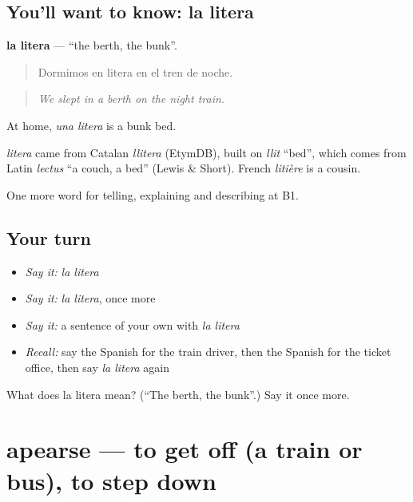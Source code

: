 \subsection*{You'll want to know: la litera}
\textbf{la litera} — \textquotedblleft{}the berth, the bunk\textquotedblright{}.

\begin{quote}
Dormimos en litera en el tren de noche.
\end{quote}

\begin{quote}
\emph{We slept in a berth on the night train.}
\end{quote}

At home, \emph{una litera} is a bunk bed.

\begin{cousinweb}
\emph{litera} came from Catalan \emph{llitera} (EtymDB), built on \emph{llit} \textquotedblleft{}bed\textquotedblright{}, which comes from Latin \emph{lectus} \textquotedblleft{}a couch, a bed\textquotedblright{} (Lewis \& Short). French \emph{litière} is a cousin.
\end{cousinweb}

\begin{grammarlens}[title={What you've built}]
One more word for telling, explaining and describing at B1.
\end{grammarlens}

\subsection*{Your turn}
\begin{itemize}
\raggedright
  \item \emph{Say it:} \emph{la litera}
  \item \emph{Say it:} \emph{la litera}, once more
  \item \emph{Say it:} a sentence of your own with \emph{la litera}
  \item \emph{Recall:} say the Spanish for the train driver, then the Spanish for the ticket office, then say \emph{la litera} again
\end{itemize}

\begin{tcolorbox}[breakable,colback=teal!4,colframe=teal!35!black,title={Before you move on}]
What does la litera mean? (\textquotedblleft{}The berth, the bunk\textquotedblright{}.) Say it once more.
\end{tcolorbox}
\section[apearse]{apearse — to get off (a train or bus), to step down}


